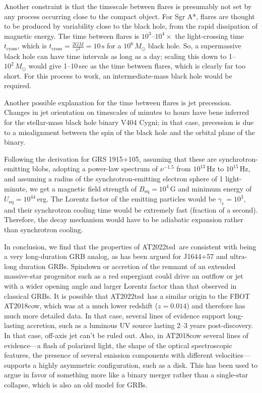 \documentclass{nature_plusfigure}
\newcommand{\at}{AT2022tsd}
\begin{document}
\begin{methods}
Another constraint is that the timescale between flares is presumably not set by any process occurring close to the compact object. For Sgr A*, flares are thought to be produced by variability close to the black hole, from the rapid dissipation of magnetic energy. The time between flares is $10^{3}$--$10^{4}\times$ the light-crossing time $t_\mathrm{cross}$, which is $t_\mathrm{cross}=\frac{2GM}{c^3}=10\,\mathrm{s}$ for a $10^6\,M_\odot$ black hole.
So, a supermassive black hole can have time intervals as long as a day; scaling this down to 1--$10^2\,M_\odot$ would give 1--10\,sec as the time between flares, which is clearly far too short.
For this process to work, an intermediate-mass black hole would be required. 

Another possible explanation for the time between flares is jet precession. Changes in jet orientation on timescales of minutes to hours have bene inferred for the stellar-mass black hole binary V404 Cygni; in that case, precession is due to a misalignment between the spin of the black hole and the orbital plane of the binary. 

Following the derivation for GRS 1915+105, assuming that these are synchrotron-emitting blobs, adopting a power-law spectrum of $\nu^{-1.5}$ from $10^{13}$\,Hz to $10^{15}\,$Hz, and assuming a radius of the synchrotron-emitting electron sphere of 1 light-minute, we get a magnetic field strength of $B_\mathrm{eq}=10^{4}\,$G and minimum energy of $U_\mathrm{eq}=10^{44}\,$erg. 
The Lorentz factor of the emitting particles would be $\gamma_e=10^{3}$, and their synchrotron cooling time would be extremely fast (fraction of a second). Therefore, the decay mechanism would have to be adiabatic expansion rather than synchrotron cooling.


In conclusion, we find that the properties of \at\ are consistent with being a very long-duration GRB analog, as has been argued for J1644+57 and ultra-long duration GRBs. 
Spindown or accretion of the remnant of an extended massive-star progenitor such as a red supergiant could drive an outflow or jet with a wider opening angle and larger Lorentz factor than that observed in classical GRBs.
It is possible that \at\ has a similar origin to the FBOT 
AT2018cow, which was at a much lower redshift ($z=0.014$) and therefore has much more detailed data. 
In that case, several lines of evidence support long-lasting accretion, such as a luminous UV source lasting 2--3 years post-discovery.
In that case, off-axis jet can't be ruled out.
Also, in AT2018cow several lines of evidence---a flash of polarized light, the shape of the optical spectroscopic features, the presence of several emission components with different velocities---supports a highly asymmetric configuration, such as a disk.
This has been used to argue in favor of something more like a binary merger rather than a single-star collapse, which is also an old model for GRBs.


\end{methods}
\end{document}
